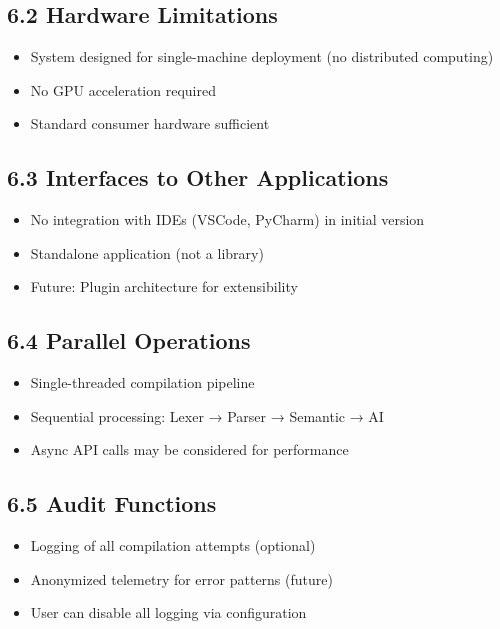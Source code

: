 \documentclass[a4paper,11pt]{article}
\begin{document}
\subsection{6.2 Hardware Limitations}

\begin{itemize}
    \item System designed for single-machine deployment (no distributed computing)
    \item No GPU acceleration required
    \item Standard consumer hardware sufficient
\end{itemize}

\subsection{6.3 Interfaces to Other Applications}

\begin{itemize}
    \item No integration with IDEs (VSCode, PyCharm) in initial version
    \item Standalone application (not a library)
    \item Future: Plugin architecture for extensibility
\end{itemize}

\subsection{6.4 Parallel Operations}

\begin{itemize}
    \item Single-threaded compilation pipeline
    \item Sequential processing: Lexer → Parser → Semantic → AI
    \item Async API calls may be considered for performance
\end{itemize}

\subsection{6.5 Audit Functions}

\begin{itemize}
    \item Logging of all compilation attempts (optional)
    \item Anonymized telemetry for error patterns (future)
    \item User can disable all logging via configuration
\end{itemize}
\end{document}

